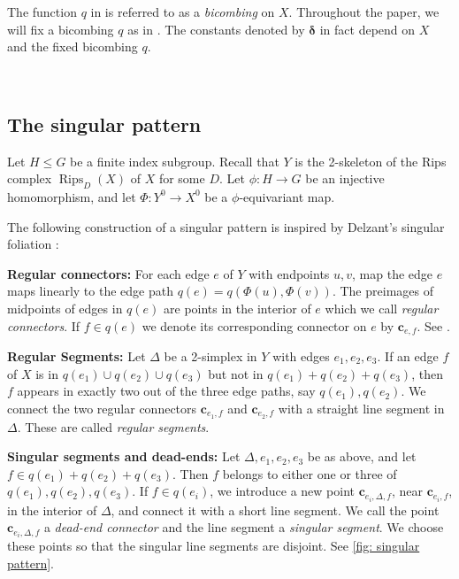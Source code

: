 \documentclass{amsart}
\numberwithin{equation}{section}
\theoremstyle{definition}
\newcommand{\bfc}{\mathbf{c}}
\newcommand{\bdelta}{{\boldsymbol\delta}}
\DeclareMathOperator{\supp}{supp}
\DeclareMathOperator{\Rips}{Rips}
\begin{document}
The function $q$ in  is referred to as a \emph{bicombing} on $X$. Throughout the paper, we will fix a bicombing $q$ as in . The constants denoted by $\bdelta$ in fact depend on $X$ and the fixed bicombing $q$.

\




\subsection{The singular pattern}

Let $H\le G$ be a finite index subgroup. 
 Recall that $Y$ is the 2-skeleton of the Rips complex $\Rips_D(X)$ of $X$ for some $D$.
Let $\phi:H\to G$ be an injective homomorphism, and let $\Phi:Y^0 \to X^0$ be a $\phi$-equivariant map.

The following construction of a singular pattern is inspired by Delzant's singular foliation \cite{delzant1995image}:

\textbf{Regular connectors:} For each edge $e$ of $Y$ with endpoints $u,v$, map the edge $e$ maps linearly to the edge path $q(e) = q(\Phi(u),\Phi(v))$.
The preimages of midpoints of edges in $q(e)$ are points in the interior of $e$ which we call \emph{regular connectors}. If $f\in q(e)$ we denote its corresponding connector on $e$ by $\bfc_{e,f}$. See .

\textbf{Regular Segments:} 
Let $\Delta$ be a 2-simplex in $Y$ with edges $e_1,e_2,e_3$.
If an edge $f$ of $X$ is in $q(e_1)\cup q(e_2) \cup q(e_3)$ but not in $q(e_1)+q(e_2)+q(e_3)$, then $f$ appears in exactly two out of the three edge paths, say $q(e_1),q(e_2)$. We connect the two regular connectors $\bfc_{e_1,f}$ and $\bfc_{e_2,f}$ with a straight line segment in $\Delta$. These are called \emph{regular segments}.


\textbf{Singular segments and dead-ends:} 
Let $\Delta,e_1,e_2,e_3$ be as above, and let $f \in q(e_1)+q(e_2)+q(e_3)$. Then $f$ belongs to either one or three of $q(e_1),q(e_2),q(e_3)$. 
If $f\in q(e_i)$, we introduce a new point $\bfc_{e_i,\Delta,f}$, near $\bfc_{e_i,f}$, in the interior of $\Delta$, and connect it with a short line segment. We call the point $\bfc_{e_i,\Delta,f}$ a \emph{dead-end connector} and the line segment a \emph{singular segment}. 
We choose these points so that the singular line segments are disjoint. See \cref{fig: singular pattern}.
\end{document}
